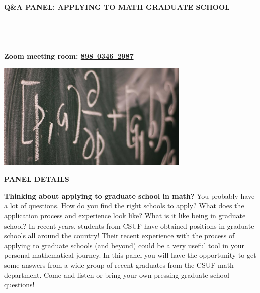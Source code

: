 \documentclass[a4paper]{article}
\begin{document}
\thispagestyle{empty}


\newcommand{\name}[1]{\textbf{\textit{#1}}}

\raggedbottom
\begin{minipage}{0.95\textwidth}
\sffamily
\centering
\LARGE{\color{csecondary}\bf Q\&A PANEL: APPLYING TO MATH GRADUATE SCHOOL}\\

\Large{\color{cprimary}\textbf{}}\\

\large{\color{csecondary}\textbf{}}\\
\large{\color{cprimary}\textbf{}}\\

\large{\color{cprimary}\textbf{}}\\
\smallskip
\large{\color{cprimary}\textbf{{\color{csecondary}Zoom meeting room:} \href{https://fullerton.zoom.us/j/89803462987}{898\ 0346\ 2987}}}

\bigskip
\includegraphics[height=2in]{mathpic.jpg}
\bigskip

\begin{minipage}[b]{0.47\textwidth}
\normalsize

{\large\raggedright
{\textbf{\color{csecondary}PANEL DETAILS}}\par
}
\normalsize
\smallskip

\textbf{\color{cprimary}Thinking about applying to graduate school in math?} You probably have a lot of questions.  How do you find the right schools to apply?  What does the application process and experience look like?  What is it like being in graduate school?
In recent years, students from CSUF have obtained positions in graduate schools all around the country!  Their recent experience with the process of applying to graduate schools (and beyond) could be a very useful tool in your personal mathematical journey.  In this panel you will have the opportunity to get some answers from a wide group of recent graduates from the CSUF math department.  Come and listen or bring your own pressing graduate school questions!
\bigskip


\end{minipage}
\end{minipage}
\end{document}
